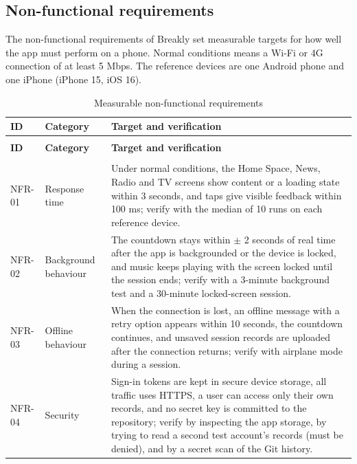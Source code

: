 \subsection{Non-functional requirements}

The non-functional requirements of Breakly set measurable targets for how well
the app must perform on a phone. Normal conditions means a Wi-Fi or 4G connection of at least 5 Mbps. The reference devices are one Android phone and
one iPhone (iPhone 15, iOS 16).

\begingroup
\small
\begin{longtable}{|>{\raggedright\arraybackslash}p{2cm}|>{\raggedright\arraybackslash}p{3.2cm}|>{\raggedright\arraybackslash}p{}|}
\caption{Measurable non-functional requirements}\label{tab:nfr}\\
\hline
\textbf{ID} & \textbf{Category} & \textbf{Target and verification} \\
\hline
\endfirsthead
\multicolumn{3}{r}{\textit{Continued from previous page}}\\[-2pt]\hline
\textbf{ID} & \textbf{Category} & \textbf{Target and verification} \\
\hline
\endhead
\multicolumn{3}{r}{\textit{Continue on next page}}\\
\endfoot
\endlastfoot

NFR-01 & Response time & Under normal conditions, the Home Space, News, Radio
and TV screens show content or a loading state within 3 seconds, and taps give
visible feedback within 100 ms; verify with the median of 10 runs on each
reference device. \\
\hline

NFR-02 & Background behaviour & The countdown stays within $\pm$ 2 seconds of
real time after the app is backgrounded or the device is locked, and music
keeps playing with the screen locked until the session ends; verify with a
3-minute background test and a 30-minute locked-screen session. \\
\hline

NFR-03 & Offline behaviour & When the connection is lost, an offline message
with a retry option appears within 10 seconds, the countdown continues, and
unsaved session records are uploaded after the connection returns; verify with
airplane mode during a session. \\
\hline

NFR-04 & Security & Sign-in tokens are kept in secure device storage, all
traffic uses HTTPS, a user can access only their own records, and no secret key
is committed to the repository; verify by inspecting the app storage, by
trying to read a second test account's records (must be denied), and by a
secret scan of the Git history. \\
\hline


\end{longtable}
